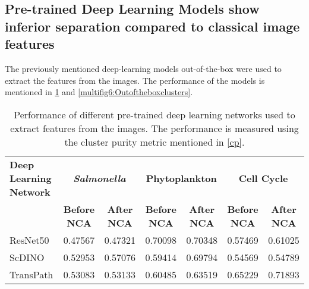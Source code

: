\documentclass[12pt,a4paper]{article}
\begin{document}
\subsection{Pre-trained Deep Learning Models show inferior separation compared to classical image features}
The previously mentioned deep-learning models out-of-the-box were used to extract the features from the images. The performance of the models is mentioned in \ref{tab:performanceofdl} and \ref{multifig6:Outoftheboxclusters}.


\begin{table}[h]
\centering
\footnotesize
\caption{Performance of different pre-trained deep learning networks used to extract features from the images. The performance is measured using the cluster purity metric mentioned in \ref{cp}.}
\label{tab:performanceofdl}
\begin{tabular}{@{}p{1.8cm}cccccc@{}}
\toprule
\textbf{Deep Learning Network} & \multicolumn{2}{c}{\textbf{\textit{Salmonella}}} & \multicolumn{2}{c}{\textbf{Phytoplankton}} & \multicolumn{2}{c}{\textbf{Cell Cycle}} \\
& \textbf{Before NCA} & \textbf{After NCA} & \textbf{Before NCA} & \textbf{After NCA} & \textbf{Before NCA} & \textbf{After NCA} \\
\midrule
ResNet50 & 0.47567 & 0.47321 & 0.70098 & 0.70348 & 0.57469 & 0.61025 \\
ScDINO  & 0.52953 & 0.57076 & 0.59414 & 0.69794 & 0.54569 & 0.54789 \\
TransPath & 0.53083 & 0.53133 & 0.60485 & 0.63519 & 0.65229 & 0.71893 \\
\bottomrule
\end{tabular}
\end{table}
\end{document}
